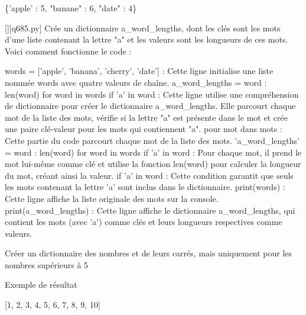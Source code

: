 \{'apple' : 5, "banane" : 6, "date" : 4\}
        \par
        \begin{solution}
            \renewcommand{\nomfichier}{q685.py}
            \pythonfile{\chemincode \nomfichier}[][\nomfichier]
            Crée un dictionnaire a_word_lengths, dont les clés sont les mots d'une liste contenant la lettre "a" et les valeurs sont les longueurs de ces mots. Voici comment fonctionne le code :

    words = ['apple', 'banana', 'cherry', 'date'] : Cette ligne initialise une liste nommée words avec quatre valeurs de chaîne.
    a_word_lengths = {word : len(word) for word in words if 'a' in word} : Cette ligne utilise une compréhension de dictionnaire pour créer le dictionnaire a_word_lengths. Elle parcourt chaque mot de la liste des mots, vérifie si la lettre "a" est présente dans le mot et crée une paire clé-valeur pour les mots qui contiennent "a".
        pour mot dans mots : Cette partie du code parcourt chaque mot de la liste des mots.
        'a_word_lengths' = {word : len(word) for word in words if 'a' in word} : Pour chaque mot, il prend le mot lui-même comme clé et utilise la fonction len(word) pour calculer la longueur du mot, créant ainsi la valeur.
        if 'a' in word : Cette condition garantit que seuls les mots contenant la lettre 'a' sont inclus dans le dictionnaire.
    print(words) : Cette ligne affiche la liste originale des mots sur la console.
    print(a_word_lengths) : Cette ligne affiche le dictionnaire a_word_lengths, qui contient les mots (avec 'a') comme clés et leurs longueurs respectives comme valeurs.
        \end{solution}
        

        \question
        Créer un dictionnaire des nombres et de leurs carrés, mais uniquement pour les nombres supérieurs à 5

Exemple de résultat

[1, 2, 3, 4, 5, 6, 7, 8, 9, 10]


